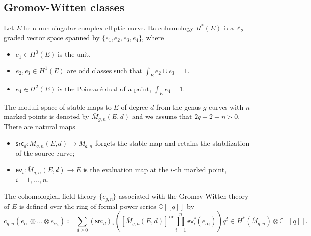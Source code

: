 \documentclass{amsart}
\numberwithin{equation}{section} %
\theoremstyle{plain}
\theoremstyle{remark}
\begin{document}
\subsection{Gromov-Witten classes}
Let $E$ be a non-singular complex elliptic curve. 
Its cohomology $H^*(E)$ is a $\mathbb{Z}_2$-graded vector space spanned by $\{e_1, e_2, e_3, e_4\}$, where
\begin{itemize}
    \item $e_1 \in H^0(E)$ is the unit.
    \item $e_2, e_3 \in H^1(E)$ are odd classes such that $\int_E e_2 \cup e_3 = 1$.
    \item $e_4 \in H^2(E)$ is the Poincaré dual of a point, $\int_E e_4 = 1$.
\end{itemize}
The moduli space of stable maps to $E$ of degree $d$ from the genus $g$ curves with $n$ marked points is denoted by $\overline{M}_{g,n}(E,d)$ and we assume that  $2g-2+n>0$. There are natural maps
\begin{itemize}
    \item $\mathsf{src}_d\colon  \overline{M}_{g,n}(E,d) \rightarrow \overline{M}_{g,n}$ forgets the stable map and retains the stabilization of the source curve;
    \item $\mathsf{ev}_i\colon  \overline{M}_{g,n}(E,d) \rightarrow E$ is the evaluation map at the $i$-th marked point, $i=1,\dots,n$.
\end{itemize}
The cohomological field theory $\{c_{g,n}\}$ associated with the Gromov-Witten theory of $E$ is defined over the ring of formal power series $\mathbb{C}[\![ q ]\!]$ by
\begin{equation*}
    c_{g,n}(e_{\alpha_1} \otimes \ldots \otimes e_{\alpha_n}) \coloneqq \sum_{d\geq 0} (\mathsf{src}_d)_{*}\left([\overline{M}_{g,n}(E,d)]^{\mathrm{vir}}\textstyle\prod_{i=1}^n \mathsf{ev}_i^*(e_{\alpha_i})\right) q^d \in H^*(\overline{M}_{g,n})\otimes \mathbb{C}[\![ q ]\!].
\end{equation*}
\end{document}
